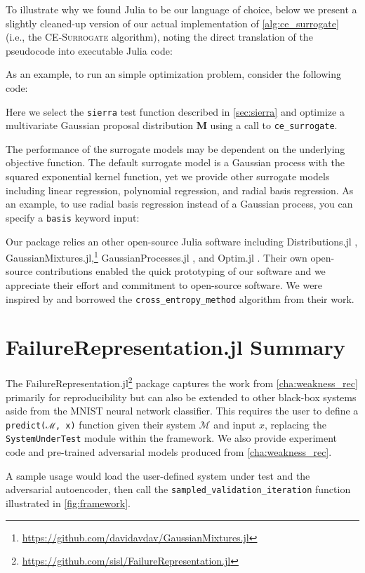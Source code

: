 

To illustrate why we found Julia to be our language of choice, below we present a slightly cleaned-up version of our actual implementation of \cref{alg:ce_surrogate} (i.e., the \textsc{CE-Surrogate} algorithm), noting the direct translation of the pseudocode into executable Julia code:



As an example, to run an simple optimization problem, consider the following code:

Here we select the \texttt{sierra} test function described in \cref{sec:sierra} and optimize a multivariate Gaussian proposal distribution $\mathbf{M}$ using a call to \texttt{ce\_surrogate}.

The performance of the surrogate models may be dependent on the underlying objective function. The default surrogate model is a Gaussian process with the squared exponential kernel function, yet we provide other surrogate models including linear regression, polynomial regression, and radial basis regression. As an example, to use radial basis regression instead of a Gaussian process, you can specify a \texttt{basis} keyword input:


Our package relies an other open-source Julia software including Distributions.jl \cite{distributions.jl}, GaussianMixtures.jl,\footnote{\url{https://github.com/davidavdav/GaussianMixtures.jl}} GaussianProcesses.jl \cite{gaussianprocesses.jl}, and Optim.jl \cite{mogensen2018optim}. Their own open-source contributions enabled the quick prototyping of our software and we appreciate their effort and commitment to open-source software. We were inspired by  and borrowed the \texttt{cross\_entropy\_method} algorithm from their work.


\section{FailureRepresentation.jl Summary}
The FailureRepresentation.jl\footnote{\url{https://github.com/sisl/FailureRepresentation.jl}} package captures the work from \cref{cha:weakness_rec} primarily for reproducibility but can also be extended to other black-box systems aside from the MNIST neural network classifier.
This requires the user to define a \texttt{predict(ℳ, x)} function given their system $\mathcal M$ and input $x$, replacing the \texttt{SystemUnderTest} module within the framework.
We also provide experiment code and pre-trained adversarial models produced from \cref{cha:weakness_rec}.

A sample usage would load the user-defined system under test and the adversarial autoencoder, then call the \texttt{sampled\_validation\_iteration} function illustrated in \cref{fig:framework}.
